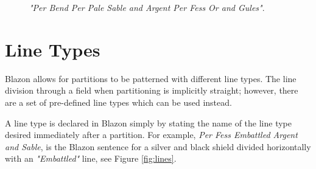\begin{figure}[H]
\hfill
{}
\hfill
\caption{\emph{"Per Bend Per Pale Sable and Argent Per Fess Or and Gules"}.}
\end{figure}

\section{Line Types}

Blazon allows for partitions to be patterned with different line types.  The line division through a field when partitioning is implicitly straight; however, there are a set of pre-defined line types which can be used instead.  

A line type is declared in Blazon simply by stating the name of the line type desired immediately after a partition. For example, \emph{Per Fess Embattled Argent and Sable}, is the Blazon sentence for a silver and black shield divided horizontally with an \emph{"Embattled"} line, see Figure \ref{fig:lines}.  

